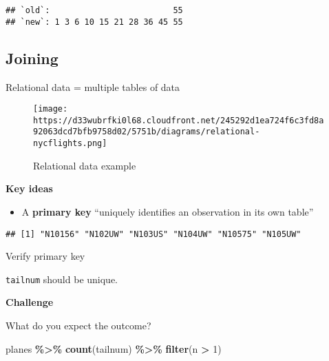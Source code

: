 \documentclass[
]{book}
\newenvironment{Shaded}{\begin{snugshade}}{\end{snugshade}}
\newcommand{\CommentTok}[1]{\textcolor[rgb]{0.56,0.35,0.01}{\textit{#1}}}
\newcommand{\DecValTok}[1]{\textcolor[rgb]{0.00,0.00,0.81}{#1}}
\newcommand{\KeywordTok}[1]{\textcolor[rgb]{0.13,0.29,0.53}{\textbf{#1}}}
\newcommand{\NormalTok}[1]{#1}
\newcommand{\OperatorTok}[1]{\textcolor[rgb]{0.81,0.36,0.00}{\textbf{#1}}}
\newcommand{\StringTok}[1]{\textcolor[rgb]{0.31,0.60,0.02}{#1}}
\providecommand{\tightlist}{%
  \setlength{\itemsep}{0pt}\setlength{\parskip}{0pt}}
\begin{document}
\begin{verbatim}
## `old`:                         55
## `new`: 1 3 6 10 15 21 28 36 45 55
\end{verbatim}

\hypertarget{joining}{%
\subsection{Joining}\label{joining}}

Relational data = multiple tables of data

\begin{figure}
\centering
\texttt{[image: https://d33wubrfki0l68.cloudfront.net/245292d1ea724f6c3fd8a92063dcd7bfb9758d02/5751b/diagrams/relational-nycflights.png]}
\caption{Relational data example}
\end{figure}

\textbf{Key ideas}

\begin{itemize}
\tightlist
\item
  A \textbf{primary key} ``uniquely identifies an observation in its own table''
\end{itemize}

\begin{Shaded}
\end{Shaded}

\begin{verbatim}
## [1] "N10156" "N102UW" "N103US" "N104UW" "N10575" "N105UW"
\end{verbatim}

Verify primary key

\texttt{tailnum} should be unique.

\textbf{Challenge}

What do you expect the outcome?

\begin{Shaded}
\begin{Highlighting}[]
\NormalTok{planes }\OperatorTok{\%\textgreater{}\%}
\StringTok{  }\KeywordTok{count}\NormalTok{(tailnum) }\OperatorTok{\%\textgreater{}\%}
\StringTok{  }\KeywordTok{filter}\NormalTok{(n }\OperatorTok{\textgreater{}}\StringTok{ }\DecValTok{1}\NormalTok{)}
\end{Highlighting}
\end{Shaded}
\end{document}
